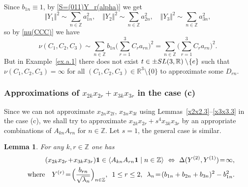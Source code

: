 \documentclass[preprint,12pt]{elsarticle}
\newtheorem{lem}[thm]{Lemma}
\numberwithin{equation}{section}
\begin{document}
Since $b_{1n}\equiv 1$, by \eqref{S=(011)Y_r(alpha)} we get
$$
\Vert Y_1\Vert^2\sim \sum_{n\in \mathbb Z}a_{1n}^2,\quad
\Vert Y_2\Vert^2\sim \sum_{n\in \mathbb Z}a_{2n}^2,\quad
\Vert Y_3\Vert^2\sim \sum_{n\in \mathbb Z}a_{3n}^2,
$$
so by \eqref{nu(CCC)} we have
\begin{equation*}
\nu( C_1, C_2, C_3)\sim\sum_{n\in \mathbb Z}b_{1n}\Big(\sum_{r=1}^3C_ra_{rn}\Big)^2=\sum_{n\in \mathbb Z}\Big(\sum_{r=1}^3C_ra_{rn}\Big)^2.
\end{equation*}
But in  Example~\ref{ex.a.1} there does not exist
$t\in \pm{\rm SL}(3,\mathbb R)\setminus \!\{e\}$ such that 
$\nu( C_1, C_2, C_3)\!=\!\infty$ for all
$(C_1,C_2,C_3)\!\in\!{\mathbb R}^3\setminus\!\{0\}$ to approximate some $D_{rn}$.

%
\subsubsection{Approximations of $x_{2k}x_{2r}+x_{3k}x_{3r}$ in the case (c)}
%
Since we can not approximate $x_{2n}x_{2t},\,x_{3n}x_{3t}$  using Lemmas~\ref{x2x2.3}--\ref{x3x3.3} in the case (c), we shall try to approximate 
$x_{2k}x_{2r}+s^4x_{3k}x_{3r}$
by an appropriate combinations of $A_{kn}A_{rn}$ for $n\in \mathbb Z$. Let $s=1$, the general case is similar.
%
\begin{lem}
\label{l.(xx+xx)(23)} 
For any  $k,r\in {\mathbb Z}$ one has
\begin{eqnarray}
 \label{(xx+xx)(23)}
 &&
(x_{2k}x_{2r}\!+\!x_{3k}x_{3r}){\bf 1}\in\langle A_{kn}A_{rn}{\bf 1}\mid n\in{\mathbb
Z}\rangle\,\,\Leftrightarrow\,\,
\Delta(Y^{(2)},Y^{(1)})\!=\!\infty,\\
\nonumber
&&
\text{where}\quad 
Y^{(r)}\!=\!\Big(\frac{b_{rn}}{\sqrt{\lambda_n}}\Big)_{n\in \mathbb Z},\,\,\,1\leq r\leq 2,\,\,\,\lambda_n\!=\!(b_{1n}+b_{2n}+b_{3n})^2-b^2_{1n}.
\end{eqnarray}
\end{lem}
%
\end{document}
